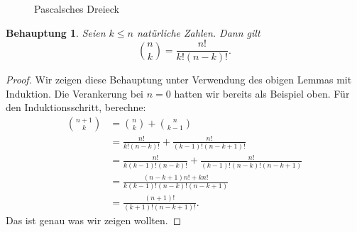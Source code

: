 \documentclass[12pt,a4paper]{article}
\newtheorem*{claim}{Behauptung}
\theoremstyle{definition}
\begin{document}
\begin{figure}[htb]
  \centering
  \caption{Pascalsches Dreieck}%
  \label{fig:pascal}
\end{figure}

\begin{claim}
  Seien $k \leq n$ natürliche Zahlen. Dann gilt
  \[\binom{n}{k}
  = \frac{n!}{k!(n-k)!}.\]
\end{claim}

\begin{proof}
  Wir zeigen diese Behauptung unter Verwendung des obigen Lemmas
  mit Induktion.
  Die Verankerung bei $n = 0$ hatten wir bereits als Beispiel oben.
  Für den Induktionsschritt, berechne:
  \begin{align*}
    \binom{n+1}{k} &= \binom{n}{k} + \binom{n}{k-1} \\
                   &= \frac{n!}{k!(n-k)!} + \frac{n!}{(k-1)!(n-k+1)!} \\
                   &= \frac{n!}{k(k-1)!(n-k)!} + \frac{n!}{(k-1)!(n-k)!(n-k+1)} \\
                   &= \frac{(n-k+1)n! + kn!}{k(k-1)!(n-k)!(n-k+1)} \\
                   &= \frac{(n+1)!}{(k+1)!(n-k+1)!}.
  \end{align*}
  Das ist genau was wir zeigen wollten.
\end{proof}
\end{document}
